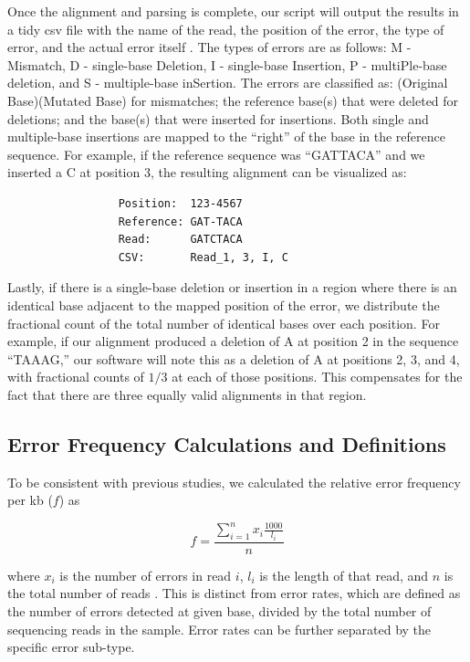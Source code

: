 \documentclass[letterpaper,12pt]{article}
\begin{document}
Once the alignment and parsing is complete, our script will output the results in a tidy csv file with the name of the read, the position of the error, the type of error, and the actual error itself \cite{wickham2014}. The types of errors are as follows: M - Mismatch, D - single-base Deletion, I - single-base Insertion, P - multiPle-base deletion, and S - multiple-base inSertion. The errors are classified as: (Original Base)(Mutated Base) for mismatches; the reference base(s) that were deleted for deletions; and the base(s) that were inserted for insertions. Both single and multiple-base insertions are mapped to the ``right'' of the base in the reference sequence. For example, if the reference sequence was ``GATTACA'' and we inserted a C at position 3, the resulting alignment can be visualized as:

\begin{verbatim}
                 Position:  123-4567
                 Reference: GAT-TACA
                 Read:      GATCTACA
                 CSV:       Read_1, 3, I, C
\end{verbatim}

Lastly, if there is a single-base deletion or insertion in a region where there is an identical base adjacent to the mapped position of the error, we distribute the fractional count of the total number of identical bases over each position. For example, if our alignment produced a deletion of A at position 2 in the sequence ``TAAAG,'' our software will note this as a deletion of A at positions 2, 3, and 4, with fractional counts of $1/3$ at each of those positions. This compensates for the fact that there are three equally valid alignments in that region.

\subsection*{Error Frequency Calculations and Definitions}
To be consistent with previous studies, we calculated the relative error frequency per kb ($f$) as

\begin{equation}
f = \frac{\displaystyle \sum^{n}_{i=1} x_i \frac{1000}{l_i}}{n}
\end{equation}

\noindent where $x_i$ is the number of errors in read $i$, $l_i$ is the length of that read, and $n$ is the total number of reads \cite{fuhrmann2005}. This is distinct from error rates, which are defined as the number of errors detected at given base, divided by the total number of sequencing reads in the sample. Error rates can be further separated by the specific error sub-type.
\end{document}
